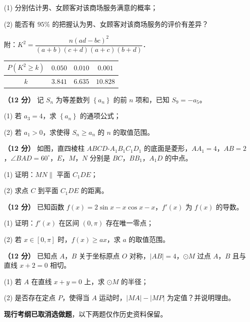   (1) 分别估计男、女顾客对该商场服务满意的概率；

  (2) 能否有 $95\%$ 的把握认为男、女顾客对该商场服务的评价有差异？

  附：$K^{2}=\dfrac{n(ad-bc)^{2}}{(a+b)(c+d)(a+c)(b+d)}$．

\begin{center}
\begin{tabular}{cccc}
\toprule
$P\left(K^{2}\ge k\right)$ & $0.050$ & $0.010$ & $0.001$ \\
\midrule
$k$ & $3.841$ & $6.635$ & $10.828$ \\
\bottomrule
\end{tabular}
\end{center}

\textbf{（12 分）} 记 $S_n$ 为等差数列 $\left\{a_n\right\}$ 的前 $n$ 项和，已知 $S_9=-a_5$。

  (1) 若 $a_3=4$，求 $\left\{a_n\right\}$ 的通项公式；

  (2) 若 $a_1>0$，求使得 $S_n\ge a_n$ 的 $n$ 的取值范围。

\textbf{（12 分）} 如图，直四棱柱 $ABCD\text{-}A_1B_1C_1D_1$ 的底面是菱形，$AA_1=4$，$AB=2$，$\angle BAD=60^\circ$，$E$，$M$，$N$ 分别是 $BC$，$BB_1$，$A_1D$ 的中点。

\begin{center}\end{center}

  (1) 证明：$MN\parallel$ 平面 $C_1DE$；

  (2) 求点 $C$ 到平面 $C_1DE$ 的距离。

\textbf{（12 分）} 已知函数 $f(x)=2\sin x-x\cos x-x$，$f'(x)$ 为 $f(x)$ 的导数。

  (1) 证明：$f'(x)$ 在区间 $(0,\pi)$ 存在唯一零点；

  (2) 若 $x\in[0,\pi]$ 时，$f(x)\ge ax$，求 $a$ 的取值范围。

\textbf{（12 分）} 已知点 $A$，$B$ 关于坐标原点 $O$ 对称，$|AB|=4$，$\odot M$ 过点 $A$，$B$ 且与直线 $x+2=0$ 相切。

  (1) 若 $A$ 在直线 $x+y=0$ 上，求 $\odot M$ 的半径；

  (2) 是否存在定点 $P$，使得当 $A$ 运动时，$|MA|-|MP|$ 为定值？并说明理由。

\par\medskip


\begin{gktip}
\textbf{ 现行考纲已取消选做题}，以下两题仅作历史资料保留。
\end{gktip}

